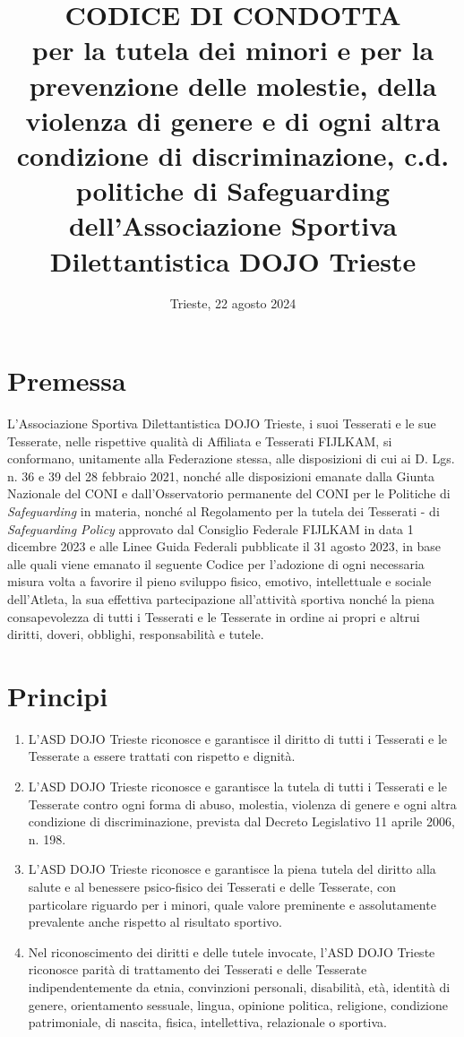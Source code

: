 \documentclass{djtsasddoc}
\title{CODICE DI CONDOTTA \\[10pt] {\normalfont\large per la tutela dei minori e per la prevenzione delle molestie, della violenza di genere e di ogni altra condizione di discriminazione, c.d. politiche di Safeguarding
dell'Associazione Sportiva Dilettantistica DOJO Trieste}}
\date{Trieste, 22 agosto 2024}
\begin{document}
		
	\maketitle
	
	\section*{Premessa}
	L'Associazione Sportiva Dilettantistica DOJO Trieste, i suoi Tesserati e le sue Tesserate, nelle rispettive qualità di Affiliata e Tesserati FIJLKAM, si conformano, unitamente alla Federazione stessa, alle disposizioni di cui ai D. Lgs. n. 36 e 39 del 28 febbraio 2021, nonché alle disposizioni emanate dalla Giunta Nazionale del CONI e dall'Osservatorio permanente del CONI per le Politiche di \textit{Safeguarding} in materia, nonché al Regolamento per la tutela dei Tesserati - di \textit{Safeguarding Policy} approvato dal Consiglio Federale FIJLKAM in data 1 dicembre 2023 e alle Linee Guida Federali pubblicate il 31 agosto 2023, in base alle quali viene emanato il seguente Codice per l'adozione di ogni necessaria misura volta a favorire il pieno sviluppo fisico, emotivo, intellettuale e sociale dell'Atleta, la sua effettiva partecipazione all'attività sportiva nonché la piena consapevolezza di tutti i Tesserati e le Tesserate in ordine ai propri e altrui diritti, doveri, obblighi, responsabilità e tutele.
	
	\section{Principi}
	\begin{enumerate}
		\item L'ASD DOJO Trieste riconosce e garantisce il diritto di tutti i Tesserati e le Tesserate a essere trattati con rispetto e dignità.
		\item L'ASD DOJO Trieste riconosce e garantisce la tutela di tutti i Tesserati e le Tesserate contro ogni forma di abuso, molestia, violenza di genere e ogni altra condizione di discriminazione, prevista dal Decreto Legislativo 11 aprile 2006, n. 198.
		\item L'ASD DOJO Trieste riconosce e garantisce la piena tutela del diritto alla salute e al benessere psico-fisico dei Tesserati e delle Tesserate, con particolare riguardo per i minori, quale valore preminente e assolutamente prevalente anche rispetto al risultato sportivo.
		\item Nel riconoscimento dei diritti e delle tutele invocate, l'ASD DOJO Trieste riconosce parità di trattamento dei Tesserati e delle Tesserate indipendentemente da etnia, convinzioni personali, disabilità, età, identità di genere, orientamento sessuale, lingua, opinione politica, religione, condizione patrimoniale, di nascita, fisica, intellettiva, relazionale o sportiva.
	\end{enumerate}
	
\end{document}

